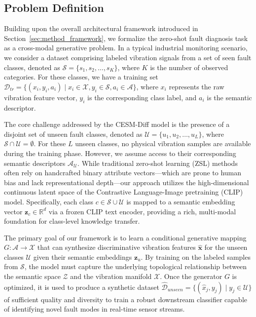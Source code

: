 \subsection{Problem Definition}
\label{sec:method_problem_definition}

Building upon the overall architectural framework introduced in Section~\ref{sec:method_framework}, we formalize the zero-shot fault diagnosis task as a cross-modal generative problem. In a typical industrial monitoring scenario, we consider a dataset comprising labeled vibration signals from a set of seen fault classes, denoted as $\mathcal{S} = \{s_1, s_2, \dots, s_K\}$, where $K$ is the number of observed categories. For these classes, we have a training set $\mathcal{D}_{tr} = \{(x_i, y_i, a_i) \mid x_i \in \mathcal{X}, y_i \in \mathcal{S}, a_i \in \mathcal{A}\}$, where $x_i$ represents the raw vibration feature vector, $y_i$ is the corresponding class label, and $a_i$ is the semantic descriptor.

The core challenge addressed by the CESM-Diff model is the presence of a disjoint set of unseen fault classes, denoted as $\mathcal{U} = \{u_1, u_2, \dots, u_L\}$, where $\mathcal{S} \cap \mathcal{U} = \emptyset$. For these $L$ unseen classes, no physical vibration samples are available during the training phase. However, we assume access to their corresponding semantic descriptors $\mathcal{A}_{\mathcal{U}}$. While traditional zero-shot learning (ZSL) methods often rely on handcrafted binary attribute vectors—which are prone to human bias and lack representational depth—our approach utilizes the high-dimensional continuous latent space of the Contrastive Language-Image pretraining (CLIP) model. Specifically, each class $c \in \mathcal{S} \cup \mathcal{U}$ is mapped to a semantic embedding vector $\mathbf{z}_c \in \mathbb{R}^d$ via a frozen CLIP text encoder, providing a rich, multi-modal foundation for class-level knowledge transfer.

The primary goal of our framework is to learn a conditional generative mapping $G: \mathcal{A} \to \mathcal{X}$ that can synthesize discriminative vibration features $\hat{\mathbf{x}}$ for the unseen classes $\mathcal{U}$ given their semantic embeddings $\mathbf{z}_u$. By training on the labeled samples from $\mathcal{S}$, the model must capture the underlying topological relationship between the semantic space $\mathcal{Z}$ and the vibration manifold $\mathcal{X}$. Once the generator $G$ is optimized, it is used to produce a synthetic dataset $\hat{\mathcal{D}}_{unseen} = \{(\hat{x}_j, y_j) \mid y_j \in \mathcal{U}\}$ of sufficient quality and diversity to train a robust downstream classifier capable of identifying novel fault modes in real-time sensor streams.
